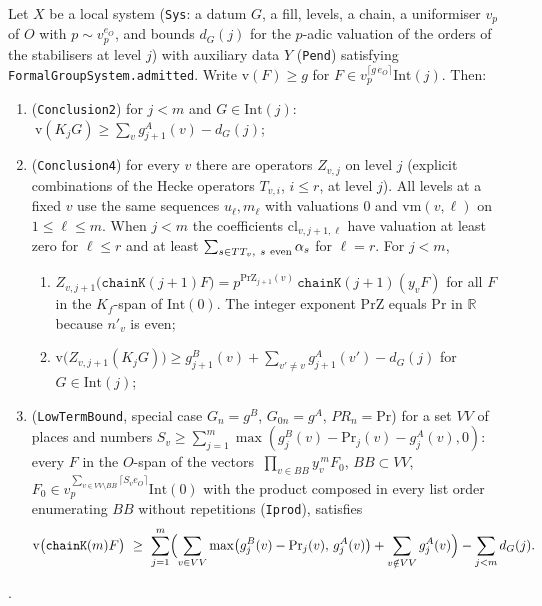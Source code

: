 \begin{proposition}\label{prop:G-local-divisibility}
Let $X$ be a local system (\texttt{Sys}: a datum $G$, a fill, levels, a chain, a uniformiser $v_p$ of $O$ with
$p\sim v_p^{e_O}$, and bounds $d_G(j)$ for the $p$-adic valuation of the orders of the stabilisers at level $j$)
with auxiliary data $Y$ (\texttt{Pend}) satisfying \texttt{FormalGroupSystem.admitted}. Write
$\mathrm{v}(F)\ge g$ for $F\in v_p^{\lceil g\,e_O\rceil}\mathrm{Int}(j)$. Then:
\begin{enumerate}
\item (\texttt{Conclusion2}) for $j<m$ and $G\in\mathrm{Int}(j)$:
 $\ \mathrm v(K_jG)\ge \sum_v g^{A}_{j+1}(v)-d_G(j)$;
\item (\texttt{Conclusion4}) for every $v$ there are operators $Z_{v,j}$ on level $j$ (explicit combinations of
 the Hecke operators $T_{v,i}$, $i\le r$, at level $j$). All levels at a fixed $v$ use the same sequences $u_\ell,m_\ell$ with valuations $0$ and $\mathrm{vm}(v,\ell)$ on $1\le\ell\le m$. When $j<m$ the coefficients $\mathrm{cl}_{v,j+1,\ell}$ have valuation at least zero for $\ell\le r$ and at least $\sum_{s\in TT_v,\ s\ {\rm even}}\alpha_s$ for $\ell=r$. For $j<m$,
 \begin{enumerate}
 \item $Z_{v,j+1}\bigl(\texttt{chainK}(j+1)F\bigr)=p^{\mathrm{PrZ}_{j+1}(v)}\,\texttt{chainK}(j+1)(y_vF)$ for all $F$ in the
  $K_f$-span of $\mathrm{Int}(0)$. The integer exponent $\mathrm{PrZ}$ equals $\mathrm{Pr}$ in $\mathbb R$ because $n'_v$ is even;
 \item $\mathrm v\bigl(Z_{v,j+1}(K_jG)\bigr)\ge g^{B}_{j+1}(v)+\sum_{v'\ne v}g^{A}_{j+1}(v')-d_G(j)$ for $G\in\mathrm{Int}(j)$;
 \end{enumerate}
\item (\texttt{LowTermBound}, special case $G_n=g^B$, $G_{0n}=g^A$, $PR_n=\mathrm{Pr}$) for a set $VV$ of places and numbers $S_v\ge\sum_{j=1}^m\max(g^B_j(v)-\mathrm{Pr}_j(v)-g^{A}_j(v),0)$:
 every $F$ in the $O$-span of the vectors
 $\ \prod_{v\in BB}y_v^{\,m}F_0$, $BB\subset VV$,
 $F_0\in v_p^{\sum_{v\in VV\setminus BB}\lceil S_ve_O\rceil}\mathrm{Int}(0)$
 with the product composed in every list order enumerating $BB$ without repetitions (\texttt{Iprod}), satisfies
 \[
   \mathrm v\bigl(\texttt{chainK}(m)F\bigr)\ \ge\ \sum_{j=1}^{m}\Bigl(\sum_{v\in VV}\max\bigl(g^B_j(v)-\mathrm{Pr}_j(v),\,g^A_j(v)\bigr)
   +\sum_{v\notin VV}g^A_j(v)\Bigr)-\sum_{j<m}d_G(j).
 \]
\end{enumerate}
\par{\small {}.}\par
\end{proposition}
